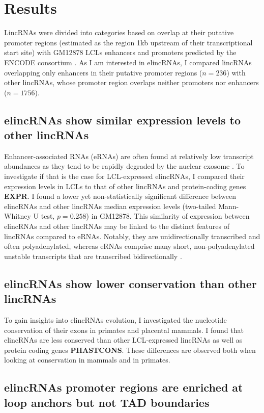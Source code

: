 \documentclass[11pt,a4paper]{report}
\begin{document}
\section*{Results}

LincRNAs were divided into categories based on overlap at their putative promoter regions (estimated as the region 1kb upstream of their transcriptional start site) with GM12878 LCLs enhancers and promoters predicted by the ENCODE consortium \cite{ENCODEProject2012}⁠. As I am interested in elincRNAs, I compared lincRNAs overlapping only enhancers in their putative promoter regions ($n=236$) with other lincRNAs, whose promoter region overlaps neither promoters nor enhancers ($n=1756$).

\subsection*{elincRNAs show similar expression levels to other lincRNAs}

Enhancer-associated RNAs (eRNAs) are often found at relatively low transcript abundances as they tend to be rapidly degraded by the nuclear exosome \cite{Lam2014}⁠. To investigate if that is the case for LCL-expressed elincRNAs, I compared their expression levels in LCLs to that of other lincRNAs and protein-coding genes \textbf{EXPR}. I found a lower yet non-statistically significant difference between elincRNAs and other lincRNAs median expression levels (two-tailed Mann-Whitney U test, $p=0.258$) in GM12878. This similarity of expression between elincRNAs and other lincRNAs may be linked to the distinct features of lincRNAs compared to eRNAs. Notably, they are unidirectionally transcribed and often polyadenylated, whereas eRNAs comprise many short, non-polyadenylated unstable transcripts that are transcribed bidirectionally \cite{Darrow2013}⁠.

\subsection*{elincRNAs show lower conservation than other lincRNAs}

To gain insights into elincRNAs evolution, I investigated the nucleotide conservation of their exons in primates and placental mammals. I found that elincRNAs are less conserved than other LCL-expressed lincRNAs as well as  protein coding genes \textbf{PHASTCONS}. These differences are observed both when looking at conservation in mammals and in primates. 

\subsection*{elincRNAs promoter regions are enriched at loop anchors but not TAD boundaries}
\end{document}
